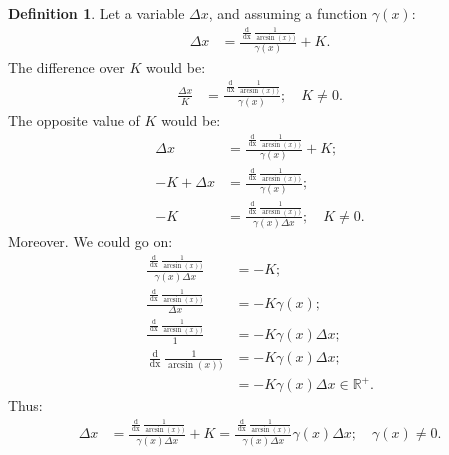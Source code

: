 \documentclass[10pt, twocolumn]{article}
\theoremstyle{plain}
\theoremstyle{definition}
\newtheorem{definition}[theorem]{Definition}
\theoremstyle{remark}
\begin{document}
\begin{definition}
	Let a variable $\Delta x$, and assuming a function $\gamma(x)$:
	\begin{align*}
	\Delta x &=	\frac{\frac{\operatorname{d}}{\operatorname{dx}}\frac{1}{\arcsin(x))}}{\gamma(x)} + K.
	\end{align*}
	The difference over $K$ would be:
	\begin{align*}
		\frac{\Delta x}{K} &= \frac{\frac{\operatorname{d}}{\operatorname{dx}}\frac{1}{\arcsin(x))}}{\gamma(x)}; \quad K \neq 0.
	\end{align*}
	The opposite value of $K$ would be:
	\begin{align*}
		\Delta x &=	\frac{\frac{\operatorname{d}}{\operatorname{dx}}\frac{1}{\arcsin(x))}}{\gamma(x)} + K;\\
		-K + \Delta x &=	\frac{\frac{\operatorname{d}}{\operatorname{dx}}\frac{1}{\arcsin(x))}}{\gamma(x)};\\
	- K &= \frac{\frac{\operatorname{d}}{\operatorname{dx}}\frac{1}{\arcsin(x))}}{\gamma(x) \Delta x}; \quad K \neq 0.
	\end{align*}
	Moreover. We could go on:
	\begin{align*}
		\frac{\frac{\operatorname{d}}{\operatorname{dx}}\frac{1}{\arcsin(x))}}{\gamma(x) \Delta x} &= -K;\\
		\frac{\frac{\operatorname{d}}{\operatorname{dx}}\frac{1}{\arcsin(x))}}{\Delta x} &= -K \gamma(x);\\
		\frac{\frac{\operatorname{d}}{\operatorname{dx}}\frac{1}{\arcsin(x))}}{1} &= -K \gamma(x)\Delta x;\\
		\frac{\operatorname{d}}{\operatorname{dx}}\frac{1}{\arcsin(x))} &= -K \gamma(x)\Delta x;\\
		&= -K \gamma(x)\Delta x \in \mathbb{R}^{+}.
	\end{align*}
	Thus:
	\begin{align*}
		\Delta x &= \frac{\frac{\operatorname{d}}{\operatorname{dx}}\frac{1}{\arcsin(x))}}{\gamma(x) \Delta x} +K = \frac{\frac{\operatorname{d}}{\operatorname{dx}}\frac{1}{\arcsin(x))}}{\gamma(x) \Delta x} \gamma(x)\Delta x; \quad \gamma(x) \neq 0.
	\end{align*}
\end{definition}

\nocite{*}



\end{document}
